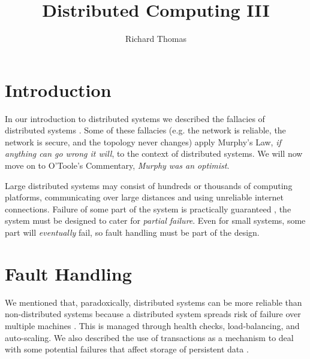 \title{Distributed Computing III}
\author{Richard Thomas}
\date{}

\maketitle

\section{Introduction}

In our introduction to distributed systems we described the fallacies of distributed systems \cite{distributed1-notes}.
Some of these fallacies (e.g. the network is reliable, the network is secure, and the topology never changes)
apply Murphy's Law, \textit{if anything can go wrong it will}, to the context of distributed systems.
We will now move on to O'Toole's Commentary, \textit{Murphy was an optimist}.

Large distributed systems may consist of hundreds or thousands of computing platforms,
communicating over large distances and using unreliable internet connections.
Failure of some part of the system is practically guaranteed \cite{datacenter-computer},
the system must be designed to cater for \emph{partial failure}.
Even for small systems, some part will \textit{eventually} fail, so fault handling must be part of the design.


\section{Fault Handling}\label{sec:faults}

We mentioned that, paradoxically, distributed systems can be more reliable than non-distributed systems
because a distributed system spreads risk of failure over multiple machines \cite{distributed1-notes}.
This is managed through health checks, load-balancing, and auto-scaling.
We also described the use of transactions as a mechanism to deal with some potential failures
that affect storage of persistent data \cite{distributed2-notes}.

